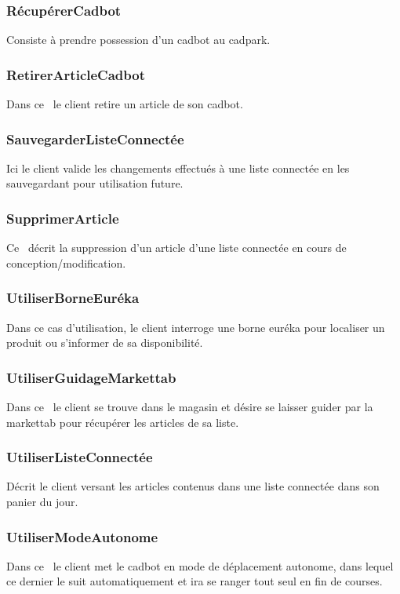 \subsubsection{RécupérerCadbot}
Consiste à prendre possession d'un cadbot au cadpark.

\subsubsection{RetirerArticleCadbot}
Dans ce \cu\ le client retire un article de son cadbot.

\subsubsection{SauvegarderListeConnectée}
Ici le client valide les changements effectués à une liste connectée en les sauvegardant pour utilisation future.

\subsubsection{SupprimerArticle}
Ce \cu\ décrit la suppression d'un article d'une liste connectée en cours de conception/modification.

\subsubsection{UtiliserBorneEuréka}
Dans ce cas d'utilisation, le client interroge une borne euréka pour localiser un produit ou s'informer de sa disponibilité.

\subsubsection{UtiliserGuidageMarkettab}
Dans ce \cu\ le client se trouve dans le magasin et désire se laisser guider par la markettab pour récupérer les articles de sa liste.

\subsubsection{UtiliserListeConnectée}
Décrit le client versant les articles contenus dans une liste connectée dans son panier du jour.

\subsubsection{UtiliserModeAutonome}
Dans ce \cu\ le client met le cadbot en mode de déplacement autonome, dans lequel ce dernier le suit automatiquement et ira se ranger tout seul en fin de courses.
